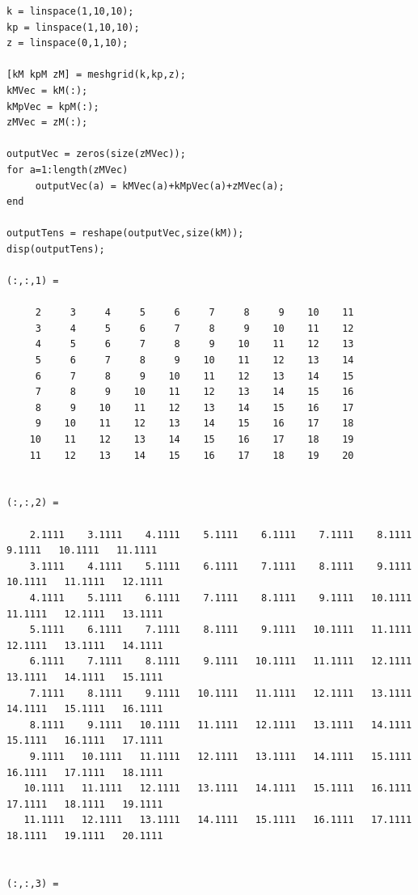 \documentclass[
]{book}
\begin{document}
\begin{verbatim}
k = linspace(1,10,10);
kp = linspace(1,10,10);
z = linspace(0,1,10);
 
[kM kpM zM] = meshgrid(k,kp,z);
kMVec = kM(:);
kMpVec = kpM(:);
zMVec = zM(:);
 
outputVec = zeros(size(zMVec));
for a=1:length(zMVec)
     outputVec(a) = kMVec(a)+kMpVec(a)+zMVec(a);
end
 
outputTens = reshape(outputVec,size(kM));
disp(outputTens);

(:,:,1) =

     2     3     4     5     6     7     8     9    10    11
     3     4     5     6     7     8     9    10    11    12
     4     5     6     7     8     9    10    11    12    13
     5     6     7     8     9    10    11    12    13    14
     6     7     8     9    10    11    12    13    14    15
     7     8     9    10    11    12    13    14    15    16
     8     9    10    11    12    13    14    15    16    17
     9    10    11    12    13    14    15    16    17    18
    10    11    12    13    14    15    16    17    18    19
    11    12    13    14    15    16    17    18    19    20


(:,:,2) =

    2.1111    3.1111    4.1111    5.1111    6.1111    7.1111    8.1111    9.1111   10.1111   11.1111
    3.1111    4.1111    5.1111    6.1111    7.1111    8.1111    9.1111   10.1111   11.1111   12.1111
    4.1111    5.1111    6.1111    7.1111    8.1111    9.1111   10.1111   11.1111   12.1111   13.1111
    5.1111    6.1111    7.1111    8.1111    9.1111   10.1111   11.1111   12.1111   13.1111   14.1111
    6.1111    7.1111    8.1111    9.1111   10.1111   11.1111   12.1111   13.1111   14.1111   15.1111
    7.1111    8.1111    9.1111   10.1111   11.1111   12.1111   13.1111   14.1111   15.1111   16.1111
    8.1111    9.1111   10.1111   11.1111   12.1111   13.1111   14.1111   15.1111   16.1111   17.1111
    9.1111   10.1111   11.1111   12.1111   13.1111   14.1111   15.1111   16.1111   17.1111   18.1111
   10.1111   11.1111   12.1111   13.1111   14.1111   15.1111   16.1111   17.1111   18.1111   19.1111
   11.1111   12.1111   13.1111   14.1111   15.1111   16.1111   17.1111   18.1111   19.1111   20.1111


(:,:,3) =


\end{verbatim}
\end{document}

